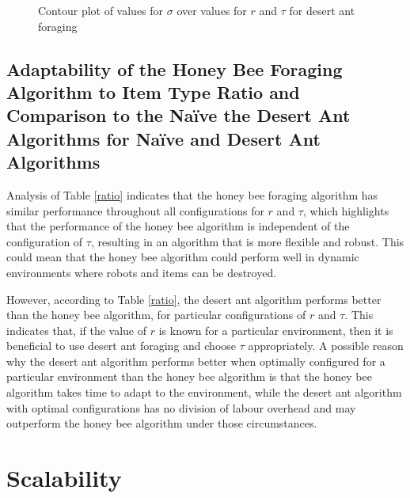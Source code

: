 \begin{figure}[!htb]
\centering
\resizebox{0.8\textwidth}{!}{}
\caption{Contour plot of values for $\sigma$ over values for $r$ and $\tau$ for desert ant foraging}
\label{desertantplot}
\end{figure}


%


\subsection{Adaptability of the Honey Bee Foraging Algorithm to Item Type Ratio and Comparison to the Na\"ive the Desert Ant Algorithms for Na\"ive and Desert Ant Algorithms}
\label{Adaptability}
Analysis of Table \ref{ratio} indicates that the honey bee foraging algorithm has similar performance throughout all configurations for $r$ and $\tau$, which highlights that the performance of the honey bee algorithm is independent of the configuration of $\tau$, resulting in an algorithm that is more flexible and robust. This could mean that the honey bee algorithm could perform well in dynamic environments where robots and items can be destroyed.

However, according to Table \ref{ratio}, the desert ant algorithm performs better than the honey bee algorithm, for particular configurations of $r$ and $\tau$. This indicates that, if the value of $r$ is known for a particular environment, then it is beneficial to use desert ant foraging and choose $\tau$ appropriately. A possible reason why the desert ant algorithm performs better when optimally configured for a particular environment than the honey bee algorithm is that the honey bee algorithm takes time to adapt to the environment, while the desert ant algorithm with optimal configurations has no division of labour overhead and may outperform the honey bee algorithm under those circumstances.

\section{Scalability}
\label{results:scability}

